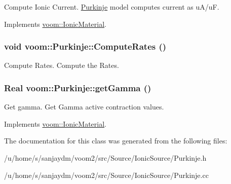 Compute Ionic Current. \hyperlink{classvoom_1_1_purkinje}{Purkinje} model computes current as uA/uF. 

Implements \hyperlink{classvoom_1_1_ionic_material_a1b95cf90af115374b428f2e5ece571cb}{voom::IonicMaterial}.\hypertarget{classvoom_1_1_purkinje_aaa3d5d9632eaca5099d0568227faa958}{
\subsubsection[{ComputeRates}]{\setlength{\rightskip}{0pt plus 5cm}void voom::Purkinje::ComputeRates ()}}
\label{classvoom_1_1_purkinje_aaa3d5d9632eaca5099d0568227faa958}


Compute Rates. Compute the Rates. \hypertarget{classvoom_1_1_purkinje_a337aa8f4b1ea0bd6f08635950cc39a2d}{
\subsubsection[{getGamma}]{\setlength{\rightskip}{0pt plus 5cm}Real voom::Purkinje::getGamma ()}}
\label{classvoom_1_1_purkinje_a337aa8f4b1ea0bd6f08635950cc39a2d}


Get gamma. Get Gamma active contraction values. 

Implements \hyperlink{classvoom_1_1_ionic_material_a98f1fa5bc5fa9ff6abfcd302111f8eac}{voom::IonicMaterial}.

The documentation for this class was generated from the following files:\begin{DoxyCompactItemize}
\item 
/u/home/s/sanjaydm/voom2/src/Source/IonicSource/Purkinje.h\item 
/u/home/s/sanjaydm/voom2/src/Source/IonicSource/Purkinje.cc\end{DoxyCompactItemize}
